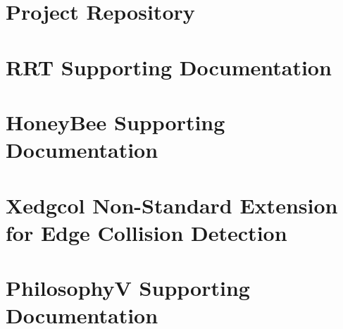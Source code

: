 \documentclass[
    11pt,           %
    a4paper,    %
    draft,          %
    oneside         %
]{report}           %
\begin{document}
\begin{appendices}

\chapter{Project Repository}
    \label{appendix:repository}
    

\chapter{RRT Supporting Documentation}
    \label{appendix:rrt_appendix}
    

\chapter{HoneyBee Supporting Documentation}
    \label{appendix:honeybee_appendix}
    

\chapter{Xedgcol Non-Standard Extension for Edge Collision Detection}
    \label{appendix:xedgcol_appendix}
    

\chapter{PhilosophyV Supporting Documentation}
    \label{appendix:philv_appendix}
    

\end{appendices} 




\clearpage 
\newpage


\end{document}
